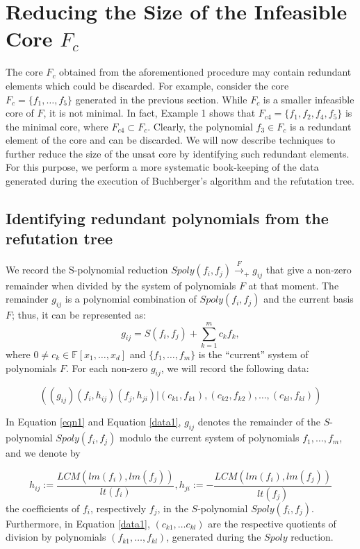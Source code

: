 \section{Reducing the Size of the Infeasible Core $F_c$}
\label{sec:alg}
The core $F_c$ obtained from the aforementioned procedure may
contain redundant elements which could be discarded. For
example, consider the core $F_c=\{f_1,\dots, f_5\}$ generated in the
previous section. While $F_c$ is a smaller infeasible core of $F$, it
is not minimal. In fact, Example 1 shows that $F_{c4} =\{f_1,f_2,f_4,f_5\}$ is the
minimal core, where $F_{c4} \subset F_{c}$. Clearly, the polynomial
$f_3 \in F_c$ is a redundant element of the core and can be 
discarded. We will now describe techniques to further reduce the size
of the unsat core by identifying such redundant elements. 
For this purpose, we perform a more 
systematic book-keeping of the data generated during the execution of
Buchberger's algorithm and the refutation tree. 

\subsection{Identifying redundant polynomials from the refutation tree}

We record the S-polynomial reduction
$Spoly(f_i,f_j)\xrightarrow{F}_+{g_{ij}}$ that give a non-zero
remainder when divided by the system of polynomials $F$ at that
moment. The remainder $g_{ij}$ is a polynomial combination of
$Spoly(f_i,f_j)$ and the current basis $F$; thus, it can be
represented as:
\begin{equation}
\label{eqn1}
g_{ij}= S(f_i,f_j)+\displaystyle\sum_{k=1}^m c_kf_k,
\end{equation}
where $0\neq c_k\in\mathbb{F}[x_1,\ldots,x_d]$ and
$\{f_1,\ldots,f_m\}$ is the ``current'' system of polynomials
$F$. For each non-zero $g_{ij}$, we will record the following data: 

\begin{equation}
\label{data1}
((g_{ij})(f_{i},h_{ij})(f_{j},h_{ji})| (c_{k1},f_{k1}),(c_{k2},f_{k2}),\dots,(c_{kl},f_{kl}))
\end{equation}

In Equation \ref{eqn1} and Equation \ref{data1}, $g_{ij}$ denotes the
remainder of the $S$-polynomial $Spoly(f_i,f_j)$ modulo the current system
of polynomials $f_1,\ldots,f_m$, and we denote by  

$$h_{ij}:=\displaystyle\frac{LCM(lm(f_i),lm(f_j))}{lt(f_i)},
h_{ji}:= - \displaystyle\frac{LCM(lm(f_i),lm(f_j))}{lt(f_j)}$$ 
the coefficients of $f_i$, respectively $f_j$, in the $S$-polynomial
$Spoly(f_i,f_j)$. Furthermore, in Equation \ref{data1}, $(c_{k1}, \dots
c_{kl})$ are the respective quotients of division by
polynomials $(f_{k1},\dots,f_{kl})$, generated during the $Spoly$ reduction.  

